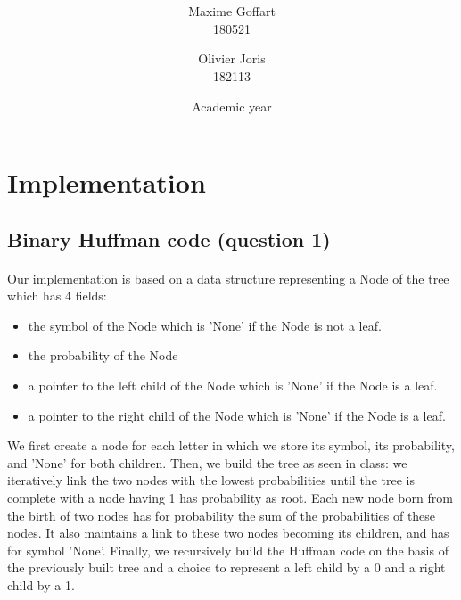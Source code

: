 \documentclass[a4paper, 11pt, oneside]{article}
\title{\ClassName\\\vspace*{0.8cm}\ProjectName\vspace{1cm}}
\author{Maxime Goffart \\180521 \and Olivier Joris\\182113}
\date{\vspace{1cm}Academic year \AcademicYear}
\begin{document}
\begin{titlingpage}
{\let\newpage\relax\maketitle}
\end{titlingpage}

\thispagestyle{empty}
\newpage




\section{Implementation}

\subsection{Binary Huffman code (question 1)}
\paragraph{}Our implementation is based on a data structure representing a Node of the tree which has 4 fields: 
\begin{itemize}
\item the symbol of the Node which is 'None' if the Node is not a leaf.
\item the probability of the Node 
\item a pointer to the left child of the Node which is 'None' if the Node is a leaf.
\item a pointer to the right child of the Node which is 'None' if the Node is a leaf.
\end{itemize}

We first create a node for each letter in which we store its symbol, its probability, and 'None' for both children.
Then, we build the tree as seen in class: we iteratively link the two nodes with the lowest probabilities until the tree is complete with a node having 1 has probability as root. Each new node born from the birth of two nodes has for probability the sum of the probabilities of these nodes. It also maintains a link to these two nodes becoming its children, and has for symbol 'None'.
Finally, we recursively build the Huffman code on the basis of the previously built tree and a choice to represent a left child by a 0 and a right child by a 1.
\end{document}
